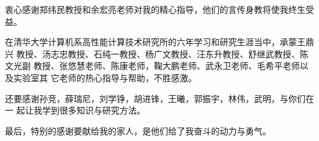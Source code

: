 

\begin{ack}

  衷心感谢郑纬民教授和余宏亮老师对我的精心指导，他们的言传身教将使我终生受益。

  在清华大学计算机系高性能计算技术研究所的六年学习和研究生涯当中，承蒙王鼎兴
  教授、汤志忠教授、石纯一教授、杨广文教授、汪东升教授、舒继武教授、陈文光副
  教授、张悠慧老师、陈康老师，鞠大鹏老师、武永卫老师、毛希平老师以及实验室其
  它老师的热心指导与帮助，不胜感激。

  还要感谢孙竞，薛瑞尼，刘学铮，胡进锋，王曦，郭振宇，林伟，武明，与你们在一
  起让我学到很多知识与研究方法。

  最后，特别的感谢要献给我的家人，是他们给了我奋斗的动力与勇气。

\end{ack}
